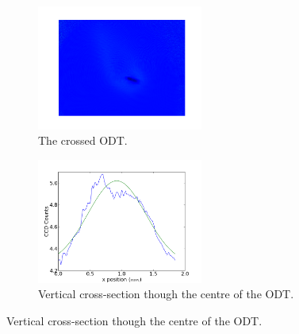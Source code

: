 \begin{figure}
\centering
    \begin{subfigure}[b]{0.5\textwidth}
        \centering
        \includegraphics[width=0.6\textwidth]{figs/ODTimage1.png}
        \caption{The crossed ODT.}
    \end{subfigure}\begin{subfigure}[b]{0.5\textwidth}
        \centering
        \includegraphics[width=0.6\textwidth]{figs/ODTimage1x.png}
        \caption{Vertical cross-section though the centre of the ODT.}
    \end{subfigure}


\end{figure}
